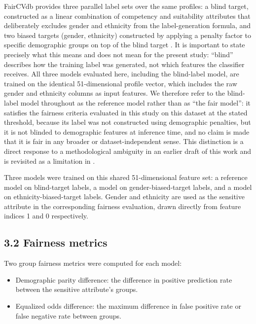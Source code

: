 \documentclass[]{einformatica}
\begin{document}
FairCVdb provides three parallel label sets over the same profiles: a blind target, constructed as a linear combination of competency and suitability attributes that deliberately excludes gender and ethnicity from the label-generation formula, and two biased targets (gender, ethnicity) constructed by applying a penalty factor to specific demographic groups on top of the blind target \cite{Pena2020}. It is important to state precisely what this means and does not mean for the present study: ``blind'' describes how the training label was generated, not which features the classifier receives. All three models evaluated here, including the blind-label model, are trained on the identical 51-dimensional profile vector, which includes the raw gender and ethnicity columns as input features. We therefore refer to the blind-label model throughout as the reference model rather than as ``the fair model'': it satisfies the fairness criteria evaluated in this study on this dataset at the stated threshold, because its label was not constructed using demographic penalties, but it is not blinded to demographic features at inference time, and no claim is made that it is fair in any broader or dataset-independent sense. This distinction is a direct response to a methodological ambiguity in an earlier draft of this work and is revisited as a limitation in .

Three models were trained on this shared 51-dimensional feature set: a reference model on blind-target labels, a model on gender-biased-target labels, and a model on ethnicity-biased-target labels. Gender and ethnicity are used as the sensitive attribute in the corresponding fairness evaluation, drawn directly from feature indices 1 and 0 respectively.

\subsection*{3.2 Fairness metrics}\label{sec:Method-Metrics}

Two group fairness metrics were computed for each model:
\begin{itemize}
\item Demographic parity difference: the difference in positive prediction rate between the sensitive attribute's groups.
\item Equalized odds difference: the maximum difference in false positive rate or false negative rate between groups.
\end{itemize}
\end{document}
